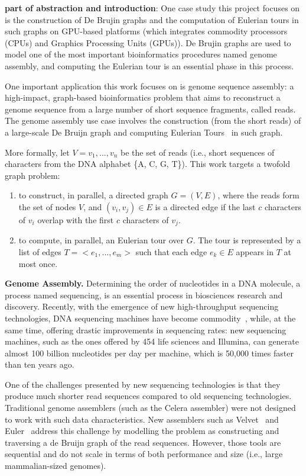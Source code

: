 \documentclass{acm_proc_article-sp}[12pt]
\begin{document}
\textbf{part of abstraction and introduction}: One case study this project focuses on is the construction of De Brujin graphs and the computation of Eulerian tours in such graphs on GPU-based platforms (which integrates commodity processors (CPUs) and Graphics Processing Units (GPUs)). De Brujin graphs are used to model one of the most important bioinformatics procedures named genome assembly, and computing the Eulerian tour is an essential phase in this process.

One important application this work focuses on is genome sequence assembly: a high-impact, graph-based bioinformatics problem that aims to reconstruct a genome sequence from a large number of short sequence fragments, called reads. The genome assembly use case involves the construction (from the short reads) of a large-scale De Bruijn graph and computing Eulerian Tours~\cite{pevzner2001eulerian, zerbino2008velvet} in such graph.

More formally, let $V={v_1,...,v_n}$ be the set of reads (i.e., short sequences of characters from the DNA alphabet \{A, C, G, T\}). This work targets a twofold graph problem:

\begin{enumerate}
 \item to construct, in parallel, a directed graph $G=(V,E)$, where the reads form the set of nodes $V$, and $(v_i,v_j) \in E$ is a directed edge if the last $c$ characters of $v_i$ overlap with the first $c$ characters of $v_j$.

 \item to compute, in parallel, an Eulerian tour over $G$. The tour is represented by a list of edges $T=<e_1,...,e_m>$ such that each edge $e_k \in E$ appears in $T$ at most once. 
\end{enumerate}

{\bf Genome Assembly.} Determining the order of nucleotides in a DNA molecule, a process named sequencing, is an essential process in biosciences research and discovery. Recently, with the emergence of new high-throughput sequencing technologies, DNA sequencing machines have become commodity~\cite{venter2010multiple}, while, at the same time, offering drastic improvements in sequencing rates: new sequencing machines, such as the ones offered by 454 life sciences and Illumina, can generate almost 100 billion nucleotides per day per machine, which is 50,000 times faster than ten years ago. 

One of the challenges presented by new sequencing technologies is that they produce much shorter read sequences compared to old sequencing technologies. Traditional genome assemblers (such as the Celera assembler) were not designed to work with such data characteristics. New assemblers such as Velvet~\cite{Zerbino2008} and Euler~\cite{pevzner2001eulerian} address this challenge by modelling the problem as constructing and traversing a de Bruijn graph of the read sequences. However, those tools are sequential and do not scale in terms of both performance and size (i.e., large mammalian-sized genomes).
\end{document}
